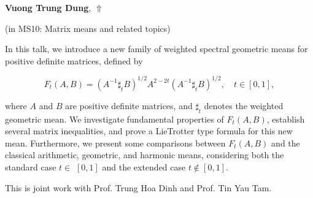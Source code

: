 \documentclass[ILAS2025-program.tex]{subfiles}
\begin{document}
\hypertarget{down0134}{}\begin{ilasabstract}
    
\textbf{Vuong Trung Dung},  \hfill \hyperlink{up0134}{$\Uparrow$}
    
    
(in {\color{mstitle}MS10: Matrix means and related topics})
        
\mtskip
    In this talk, we introduce a new family of weighted spectral geometric means for positive definite matrices, defined by

$$
F_t(A, B)=\left(A^{-1} \sharp_t B\right)^{1 / 2} A^{2-2 t}\left(A^{-1} \sharp_t B\right)^{1 / 2}, \quad t \in[0,1],
$$

where $A$ and $B$ are positive definite matrices, and $\sharp_t$ denotes the weighted geometric mean. We investigate fundamental properties of $F_t(A, B)$, establish several matrix inequalities, and prove a LieTrotter type formula for this new mean. Furthermore, we present some comparisons between $F_t(A, B)$ and the classical arithmetic, geometric, and harmonic means, considering both the standard case $t \in$ $[0,1]$ and the extended case $t \notin[0,1]$.

This is joint work with Prof. Trung Hoa Dinh and Prof. Tin Yau Tam.
\end{ilasabstract}
    
\end{document}
